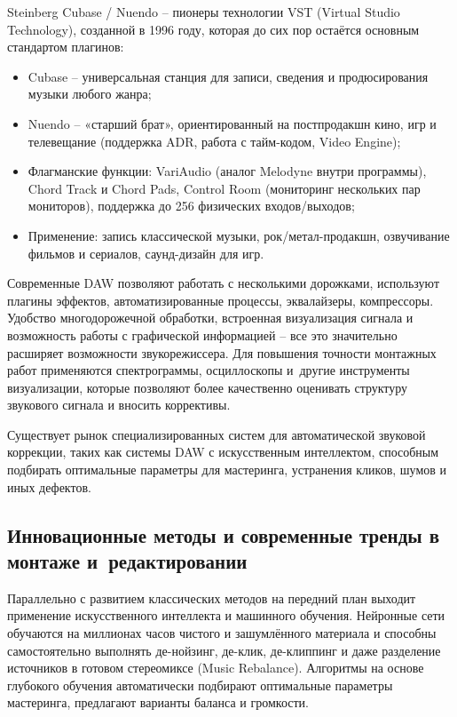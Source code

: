 \documentclass{ou}
\begin{document}
Steinberg Cubase / Nuendo -- пионеры технологии VST (Virtual Studio Technology), созданной в 1996 году, которая до сих пор остаётся основным стандартом плагинов:
\begin{itemize}[label=-, leftmargin=0em, itemindent=3.35em, nosep]
\item Cubase -- универсальная станция для записи, сведения и продюсирования музыки любого жанра;
\item Nuendo -- «старший брат», ориентированный на постпродакшн кино, игр и телевещание (поддержка ADR, работа с тайм-кодом, Video Engine);
\item Флагманские функции: VariAudio (аналог Melodyne внутри программы), Chord Track и Chord Pads, Control Room (мониторинг нескольких пар мониторов), поддержка до 256 физических входов/выходов;
\item Применение: запись классической музыки, рок/метал-продакшн, озвучивание фильмов и сериалов, саунд-дизайн для игр.
\end{itemize}

Современные DAW позволяют работать с несколькими дорожками, используют плагины эффектов, автоматизированные процессы, эквалайзеры, компрессоры. Удобство многодорожечной обработки, встроенная визуализация сигнала и возможность работы с графической информацией -- все это значительно расширяет возможности звукорежиссера. Для повышения точности монтажных работ применяются спектрограммы, осциллоскопы и~другие инструменты визуализации, которые позволяют более качественно оценивать структуру звукового сигнала и вносить коррективы.

Существует рынок специализированных систем для автоматической звуковой коррекции, таких как системы DAW с искусственным интеллектом, способным подбирать оптимальные параметры для мастеринга, устранения кликов, шумов и иных дефектов.
\subsection{Инновационные методы и современные тренды в монтаже и~редактировании}
Параллельно с развитием классических методов на передний план выходит применение искусственного интеллекта и машинного обучения. Нейронные сети обучаются на миллионах часов чистого и зашумлённого материала и способны самостоятельно выполнять де-нойзинг, де-клик, де-клиппинг и даже разделение источников в готовом стереомиксе (Music Rebalance). Алгоритмы на основе глубокого обучения автоматически подбирают оптимальные параметры мастеринга, предлагают варианты баланса и громкости.
\end{document}
